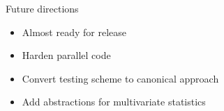 \begin{frame}{Future directions}

\begin{itemize}
\tightlist
\item
  Almost ready for release
\item
  Harden parallel code
\item
  Convert testing scheme to canonical approach
\item
  Add abstractions for multivariate statistics
\end{itemize}

\end{frame}

\begin{frame}


\end{frame}

\begin{frame}


\end{frame}
